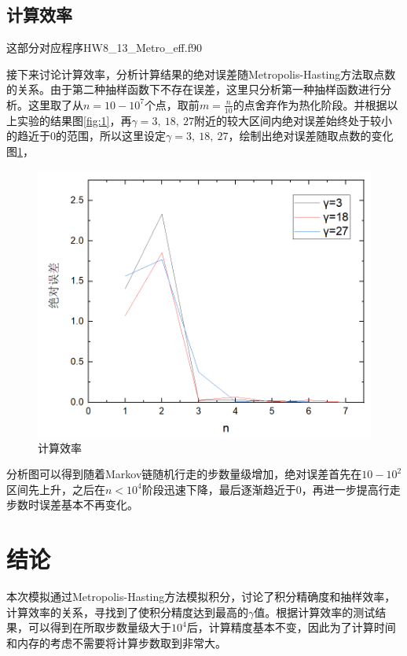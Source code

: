 \documentclass{article}
\begin{document}
\subsection{计算效率}
这部分对应程序HW8\_13\_Metro\_eff.f90


接下来讨论计算效率，分析计算结果的绝对误差随Metropolis-Hasting方法取点数的关系。由于第二种抽样函数下不存在误差，这里只分析第一种抽样函数进行分析。这里取了从$ n=10-10^7 $个点，取前$ m=\frac{n}{10} $的点舍弃作为热化阶段。并根据以上实验的结果图\ref{fig:1}，再$ \gamma=3,\ 18,\ 27$附近的较大区间内绝对误差始终处于较小的趋近于0的范围，所以这里设定$ \gamma=3,\ 18,\ 27 $，绘制出绝对误差随取点数的变化图\ref{fig:3}，
	\begin{figure}[!h]
	
	\centering
	\includegraphics[scale=0.6]{error_n}
	\caption{\heiti{}计算效率}
	\label{fig:3}
\end{figure}
分析图可以得到随着Markov链随机行走的步数量级增加，绝对误差首先在$ 10-10^2 $区间先上升，之后在$ n<10^4 $阶段迅速下降，最后逐渐趋近于0，再进一步提高行走步数时误差基本不再变化。
	\section{结论}
	本次模拟通过Metropolis-Hasting方法模拟积分，讨论了积分精确度和抽样效率，计算效率的关系，寻找到了使积分精度达到最高的$ \gamma $值。根据计算效率的测试结果，可以得到在所取步数量级大于$ 10^4 $后，计算精度基本不变，因此为了计算时间和内存的考虑不需要将计算步数取到非常大。
\end{document}
